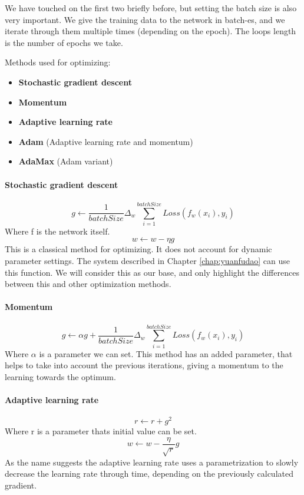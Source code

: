 We have touched on the first two briefly before, but setting the batch size is also very important. We give the training data to the network in batch-es, and we iterate through them multiple times (depending on the epoch). The loops length is the number of epochs we take.

Methods used for optimizing:
\begin{itemize}
	\item \textbf{Stochastic gradient descent}
	\item \textbf{Momentum}
	\item \textbf{Adaptive learning rate}
	\item \textbf{Adam} (Adaptive learning rate and momentum)
	\item \textbf{AdaMax} (Adam variant)
\end{itemize}

\paragraph*{Stochastic gradient descent}
\[g \leftarrow \frac{1}{batchSize}\Delta_w \sum_{i=1}^{batchSize}Loss(f_w(x_i), y_i)\]
Where f is the network itself.
\[w \leftarrow w - \eta g\]
This is a classical method for optimizing. It does not account for dynamic parameter settings. The system described in Chapter \ref{chap:yuanfudao} can use this function.
We will consider this as our base, and only highlight the differences between this and other optimization methods.

\paragraph*{Momentum}
\[g \leftarrow \alpha g + \frac{1}{batchSize}\Delta_w \sum_{i=1}^{batchSize}Loss(f_w(x_i), y_i)\]
Where \(\alpha\) is a parameter we can set.
This method has an added parameter, that helps to take into account the previous iterations, giving a momentum to the learning towards the optimum.

\paragraph*{Adaptive learning rate}
\[r \leftarrow r + g^2\]
Where r is a parameter thats initial value can be set.
\[w \leftarrow w - \frac{\eta}{\sqrt{r}} g\]
As the name suggests the adaptive learning rate uses a parametrization to slowly decrease the learning rate through time, depending on the previously calculated gradient.

